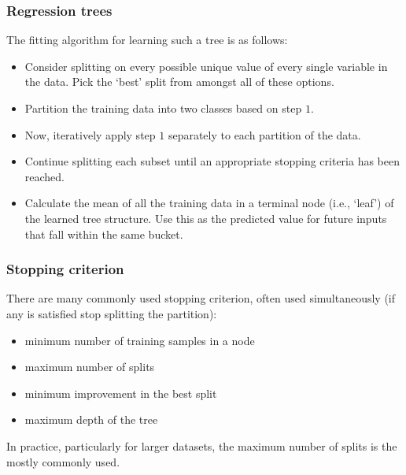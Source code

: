 \begin{frame}[fragile] \frametitle{Regression trees}
The fitting algorithm for learning such a tree is as follows:
\begin{itemize}
\item Consider splitting on every possible unique value of every
single variable in the data. Pick the `best' split from amongst
all of these options.
\item Partition the training data into two classes based on step $1$.
\item Now, iteratively apply step $1$ separately to each partition of
the data.
\item Continue splitting each subset until an appropriate
stopping criteria has been reached.
\item Calculate the mean of all the training data in a terminal node
(i.e., `leaf') of the learned tree structure. Use this as the predicted
value for future inputs that fall within the same bucket.
\end{itemize}
\end{frame}

\begin{frame}[fragile] \frametitle{Stopping criterion}
There are many commonly used stopping criterion, often used
simultaneously (if any is satisfied stop splitting the partition):
\begin{itemize}
\item minimum number of training samples in a node
\item maximum number of splits
\item minimum improvement in the best split
\item maximum depth of the tree
\end{itemize}
In practice, particularly for larger datasets, the maximum number
of splits is the mostly commonly used.
\end{frame}

